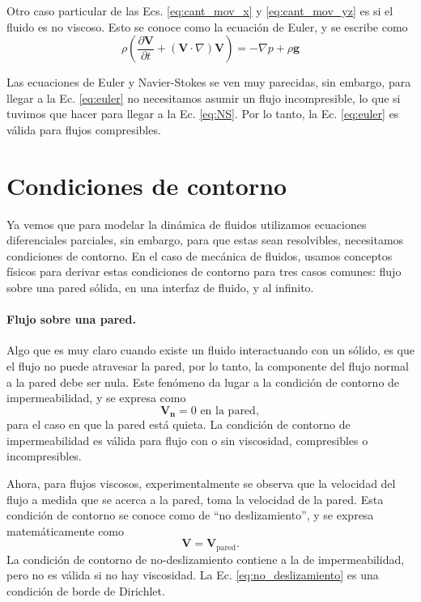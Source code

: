 Otro caso particular de las Ecs. \eqref{eq:cant_mov_x} y \eqref{eq:cant_mov_yz} es si el fluido es no viscoso.
Esto se conoce como la ecuación de Euler, y se escribe como
%
\begin{equation}\label{eq:euler}
\rho\left(\frac{\partial \mathbf{V}}{\partial t} + (\mathbf{V}\cdot\nabla)\mathbf{V} \right) = -\nabla p + \rho \mathbf{g} 
\end{equation}

Las ecuaciones de Euler y Navier-Stokes se ven muy parecidas, sin embargo, para llegar a la Ec. \eqref{eq:euler} no necesitamos asumir un flujo incompresible, lo que si tuvimos que hacer para llegar a la Ec. \eqref{eq:NS}.
Por lo tanto, la Ec. \eqref{eq:euler} es válida para flujos compresibles.

\section*{Condiciones de contorno}

Ya vemos que para modelar la dinámica de fluidos utilizamos ecuaciones diferenciales parciales, sin embargo, para que estas sean resolvibles, necesitamos condiciones de contorno.
En el caso de mecánica de fluidos, usamos conceptos físicos para derivar estas condiciones de contorno para tres casos comunes: flujo sobre una pared sólida, en una interfaz de fluido, y al infinito.  

\paragraph*{Flujo sobre una pared.}
Algo que es muy claro cuando existe un fluido interactuando con un sólido, es que el flujo no puede atravesar la pared, por lo tanto, la componente del flujo normal a la pared debe ser nula.
Este fenómeno da lugar a la condición de contorno de impermeabilidad, y se expresa como
%
\begin{equation}\label{eq:impermeabilidad}
\mathbf{V}_\mathbf{n} = 0 \text{ en la pared},
\end{equation}
%
para el caso en que la pared está quieta.
La condición de contorno de impermeabilidad es válida para flujo con o sin viscosidad, compresibles o incompresibles.

Ahora, para flujos viscosos, experimentalmente se observa que la velocidad del flujo a medida que se acerca a la pared, toma la velocidad de la pared. 
Esta condición de contorno se conoce como de ``no deslizamiento'', y se expresa matemáticamente como
%
\begin{equation}\label{eq:no_deslizamiento}
\mathbf{V} = \mathbf{V}_\text{pared}.
\end{equation}
%
La condición de contorno de no-deslizamiento contiene a la de impermeabilidad, pero no es válida si no hay viscosidad.
La Ec. \eqref{eq:no_deslizamiento} es una condición de borde de Dirichlet.

